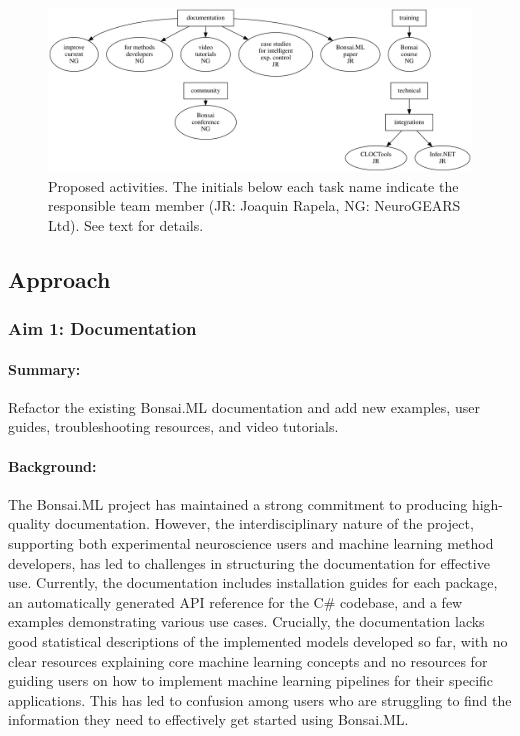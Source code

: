
\begin{figure}
    \centering
    \includegraphics[width=6in]{activitiesGraphs/activities_larger.png}

    \caption{Proposed activities. The initials below each task name indicate
    the responsible team member (JR: Joaquin Rapela, NG: NeuroGEARS Ltd). See
    text for details.}

\end{figure}

\subsection{Approach}

\subsubsection{Aim 1: Documentation}

\paragraph{Summary:} Refactor the existing Bonsai.ML documentation and add new examples, user guides, troubleshooting resources, and video tutorials.

\paragraph{Background:} The Bonsai.ML project has maintained a strong commitment to producing high-quality documentation. However, the interdisciplinary nature of the project, supporting both experimental neuroscience users and machine learning method developers, has led to challenges in structuring the documentation for effective use. Currently, the documentation includes installation guides for each package, an automatically generated API reference for the C\# codebase, and a few examples demonstrating various use cases. Crucially, the documentation lacks good statistical descriptions of the implemented models developed so far, with no clear resources explaining core machine learning concepts and no resources for guiding users on how to implement machine learning pipelines for their specific applications. This has led to confusion among users who are struggling to find the information they need to effectively get started using Bonsai.ML.


